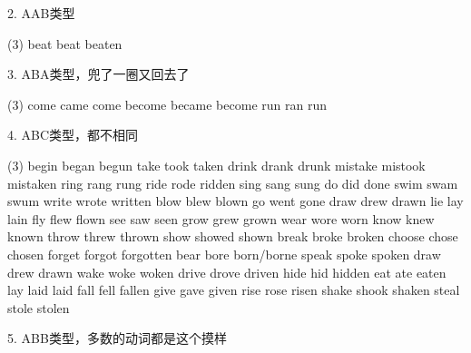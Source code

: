 \documentclass[a4paper]{article}
\begin{document}
2. AAB类型
\begin{tasks}[style=enumerate](3)
  \task[+] beat   \task[+] beat   \task[+] beaten
\end{tasks}

3. ABA类型，兜了一圈又回去了
\begin{tasks}[style=enumerate](3)
  \task[+] come    \task[+] came   \task[+] come
  \task[+] become   \task[+] became   \task[+] become
  \task[+] run   \task[+] ran   \task[+] run
\end{tasks}

4. ABC类型，都不相同

\begin{tasks}[style=enumerate](3)
  \task[+] begin  \task[+] began  \task[+] begun
  \task[+] take    \task[+] took    \task[+] taken
  \task[+] drink    \task[+] drank   \task[+] drunk
  \task[+] mistake   \task[+] mistook   \task[+] mistaken
  \task[+] ring   \task[+] rang  \task[+] rung
  \task[+] ride   \task[+] rode  \task[+] ridden
  \task[+] sing   \task[+] sang  \task[+] sung
  \task[+] do   \task[+] did \task[+] done
  \task[+] swim   \task[+] swam \task[+] swum
  \task[+] write   \task[+] wrote \task[+] written
  \task[+] blow   \task[+] blew \task[+] blown
  \task[+] go   \task[+] went \task[+] gone
  \task[+] draw   \task[+] drew \task[+] drawn
  \task[+] lie   \task[+] lay \task[+] lain
  \task[+] fly   \task[+] flew \task[+] flown
  \task[+] see   \task[+] saw \task[+] seen
  \task[+] grow   \task[+] grew \task[+] grown
  \task[+] wear   \task[+] wore \task[+] worn
  \task[+] know   \task[+] knew \task[+] known
  \task[+] throw   \task[+] threw \task[+] thrown
  \task[+] show   \task[+] showed \task[+] shown
  \task[+] break   \task[+] broke \task[+] broken
  \task[+] choose   \task[+] chose \task[+] chosen
  \task[+] forget   \task[+] forgot \task[+] forgotten
  \task[+] bear   \task[+] bore \task[+] born/borne
  \task[+] speak   \task[+] spoke \task[+] spoken
  \task[+] draw   \task[+] drew \task[+] drawn
  \task[+] wake   \task[+] woke \task[+] woken
  \task[+] drive   \task[+] drove \task[+] driven
  \task[+] hide   \task[+] hid \task[+] hidden
  \task[+] eat   \task[+] ate \task[+] eaten
  \task[+] lay   \task[+] laid \task[+] laid
  \task[+] fall   \task[+] fell \task[+] fallen
  \task[+] give   \task[+] gave \task[+] given
  \task[+] rise   \task[+] rose \task[+] risen
  \task[+] shake   \task[+] shook \task[+] shaken
  \task[+] steal   \task[+] stole \task[+] stolen
 \end{tasks}

5. ABB类型，多数的动词都是这个摸样
\end{document}

